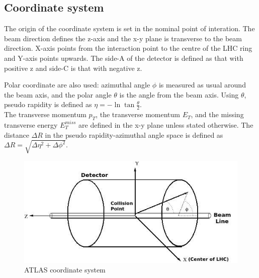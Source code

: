 \documentclass[a4paper, oneside]{book}
\begin{document}
				\subsection{Coordinate system}
					The origin of the coordinate system is set in the nominal point of interation. The beam direction defines the z-axis and the x-y plane is transverse to the beam direction. X-axis points from the interaction point to the centre of the LHC ring and Y-axis points upwards. The side-A of the detector is defined as that with positive z and side-C is that with negative z.
					
					Polar coordinate are also used: azimuthal angle $\phi$ is measured as usual around the beam axis, and the polar angle $\theta$ is the angle from the beam axis. Using $\theta$, pseudo rapidity is defined as $\eta= -\ln{\tan{\frac{\theta}{2}}}$. \\
					The transverse momentum $p_T$, the transverse momentum $E_T$, and the missing transverse energy $E_T^{miss}$ are defined in the x-y plane unless stated otherwise.  The distance $\Delta R$ in the pseudo rapidity-azimuthal angle space is defined as $\Delta R = \sqrt{\Delta \eta^2 + \Delta \phi^2 }$.
					\begin{figure}[H]
						\centering
						\includegraphics[width=0.3\textheight]{tesi_images/atlas_coord.jpeg}
						\caption{ATLAS coordinate system}
					\end{figure}
\end{document}

